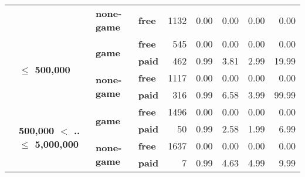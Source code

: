 \begin{tabular}{llll|rrrrr}
\cline{3-9}
      &                                 & \textbf{none-game} & \textbf{free} &   1132 &       0.00 &       0.00 &       0.00 &          0.00 \\
\cline{2-9}
      & \multirow{4}{*}{\textbf{$\leq$ 500,000}} & \multirow{2}{*}{\textbf{game}} & \textbf{free} &    545 &       0.00 &       0.00 &       0.00 &          0.00 \\
      &                                 &           & \textbf{paid} &    462 &       0.99 &       3.81 &       2.99 &         19.99 \\
\cline{3-9}
      &                                 & \multirow{2}{*}{\textbf{none-game}} & \textbf{free} &   1117 &       0.00 &       0.00 &       0.00 &          0.00 \\
      &                                 &           & \textbf{paid} &    316 &       0.99 &       6.58 &       3.99 &         99.99 \\
\cline{2-9}
\cline{3-9}
      & \multirow{4}{*}{\textbf{500,000 $<$ .. $\leq$ 5,000,000}} & \multirow{2}{*}{\textbf{game}} & \textbf{free} &   1496 &       0.00 &       0.00 &       0.00 &          0.00 \\
      &                                 &           & \textbf{paid} &     50 &       0.99 &       2.58 &       1.99 &          6.99 \\
\cline{3-9}
      &                                 & \multirow{2}{*}{\textbf{none-game}} & \textbf{free} &   1637 &       0.00 &       0.00 &       0.00 &          0.00 \\
      &                                 &           & \textbf{paid} &      7 &       0.99 &       4.63 &       4.99 &          9.99 \\
\bottomrule
\end{tabular}
